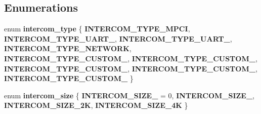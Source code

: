 \subsection*{Enumerations}
\begin{DoxyCompactItemize}
\item 
\mbox{\label{group__QorIQInterCom_ga6a16d51fdef50a51b3a55f374fba235f}} 
enum {\bfseries intercom\+\_\+type} \{ \newline
{\bfseries I\+N\+T\+E\+R\+C\+O\+M\+\_\+\+T\+Y\+P\+E\+\_\+\+M\+P\+CI}, 
{\bfseries I\+N\+T\+E\+R\+C\+O\+M\+\_\+\+T\+Y\+P\+E\+\_\+\+U\+A\+R\+T\+\_}, 
{\bfseries I\+N\+T\+E\+R\+C\+O\+M\+\_\+\+T\+Y\+P\+E\+\_\+\+U\+A\+R\+T\+\_}, 
{\bfseries I\+N\+T\+E\+R\+C\+O\+M\+\_\+\+T\+Y\+P\+E\+\_\+\+N\+E\+T\+W\+O\+RK}, 
\newline
{\bfseries I\+N\+T\+E\+R\+C\+O\+M\+\_\+\+T\+Y\+P\+E\+\_\+\+C\+U\+S\+T\+O\+M\+\_}, 
{\bfseries I\+N\+T\+E\+R\+C\+O\+M\+\_\+\+T\+Y\+P\+E\+\_\+\+C\+U\+S\+T\+O\+M\+\_}, 
{\bfseries I\+N\+T\+E\+R\+C\+O\+M\+\_\+\+T\+Y\+P\+E\+\_\+\+C\+U\+S\+T\+O\+M\+\_}, 
{\bfseries I\+N\+T\+E\+R\+C\+O\+M\+\_\+\+T\+Y\+P\+E\+\_\+\+C\+U\+S\+T\+O\+M\+\_}, 
\newline
{\bfseries I\+N\+T\+E\+R\+C\+O\+M\+\_\+\+T\+Y\+P\+E\+\_\+\+C\+U\+S\+T\+O\+M\+\_}
 \}
\item 
\mbox{\label{group__QorIQInterCom_ga10af27ac185549095b66e24554833613}} 
enum {\bfseries intercom\+\_\+size} \{ {\bfseries I\+N\+T\+E\+R\+C\+O\+M\+\_\+\+S\+I\+Z\+E\+\_} = 0, 
{\bfseries I\+N\+T\+E\+R\+C\+O\+M\+\_\+\+S\+I\+Z\+E\+\_}, 
{\bfseries I\+N\+T\+E\+R\+C\+O\+M\+\_\+\+S\+I\+Z\+E\+\_\+2K}, 
{\bfseries I\+N\+T\+E\+R\+C\+O\+M\+\_\+\+S\+I\+Z\+E\+\_\+4K}
 \}
\end{DoxyCompactItemize}
